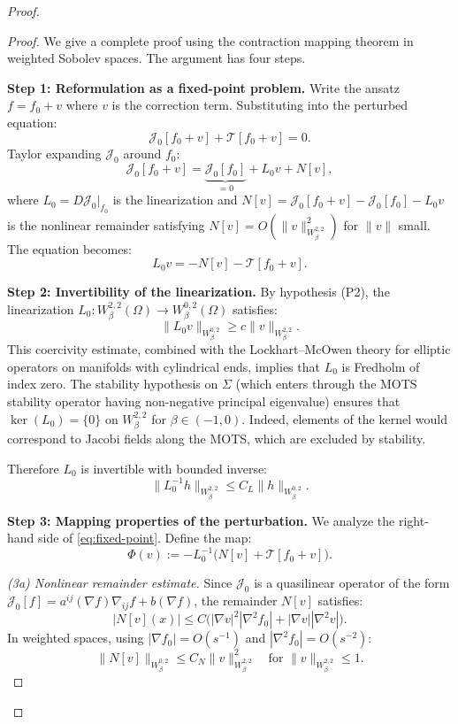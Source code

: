 \documentclass[12pt]{article}
\theoremstyle{plain}
\theoremstyle{definition}
\theoremstyle{remark}
\begin{document}
\begin{proof}
\begin{proof}
We give a complete proof using the contraction mapping theorem in weighted Sobolev spaces. The argument has four steps.

\textbf{Step 1: Reformulation as a fixed-point problem.}
Write the ansatz $f = f_0 + v$ where $v$ is the correction term. Substituting into the perturbed equation:
\[
\mathcal{J}_0[f_0 + v] + \mathcal{T}[f_0 + v] = 0.
\]
Taylor expanding $\mathcal{J}_0$ around $f_0$:
\[
\mathcal{J}_0[f_0 + v] = \underbrace{\mathcal{J}_0[f_0]}_{=0} + L_0 v + N[v],
\]
where $L_0 = D\mathcal{J}_0|_{f_0}$ is the linearization and $N[v] = \mathcal{J}_0[f_0 + v] - \mathcal{J}_0[f_0] - L_0 v$ is the nonlinear remainder satisfying $N[v] = O(\|v\|^2_{W^{2,2}_\beta})$ for $\|v\|$ small. The equation becomes:
\begin{equation}\label{eq:fixed-point}
L_0 v = -N[v] - \mathcal{T}[f_0 + v].
\end{equation}

\textbf{Step 2: Invertibility of the linearization.}
By hypothesis (P2), the linearization $L_0: W^{2,2}_\beta(\Omega) \to W^{0,2}_\beta(\Omega)$ satisfies:
\[
\|L_0 v\|_{W^{0,2}_\beta} \geq c \|v\|_{W^{2,2}_\beta}.
\]
This coercivity estimate, combined with the Lockhart--McOwen theory \cite{lockhartmccowen1985} for elliptic operators on manifolds with cylindrical ends, implies that $L_0$ is Fredholm of index zero. The stability hypothesis on $\Sigma$ (which enters through the MOTS stability operator having non-negative principal eigenvalue) ensures that $\ker(L_0) = \{0\}$ on $W^{2,2}_\beta$ for $\beta \in (-1, 0)$. Indeed, elements of the kernel would correspond to Jacobi fields along the MOTS, which are excluded by stability.

Therefore $L_0$ is invertible with bounded inverse:
\[
\|L_0^{-1} h\|_{W^{2,2}_\beta} \leq C_L \|h\|_{W^{0,2}_\beta}.
\]

\textbf{Step 3: Mapping properties of the perturbation.}
We analyze the right-hand side of \eqref{eq:fixed-point}. Define the map:
\[
\Phi(v) := -L_0^{-1}\bigl(N[v] + \mathcal{T}[f_0 + v]\bigr).
\]

\textit{(3a) Nonlinear remainder estimate.} Since $\mathcal{J}_0$ is a quasilinear operator of the form $\mathcal{J}_0[f] = a^{ij}(\nabla f)\nabla_{ij}f + b(\nabla f)$, the remainder $N[v]$ satisfies:
\[
|N[v](x)| \leq C\bigl(|\nabla v|^2 |\nabla^2 f_0| + |\nabla v||\nabla^2 v|\bigr).
\]
In weighted spaces, using $|\nabla f_0| = O(s^{-1})$ and $|\nabla^2 f_0| = O(s^{-2})$:
\[
\|N[v]\|_{W^{0,2}_\beta} \leq C_N \|v\|_{W^{2,2}_\beta}^2 \quad \text{for } \|v\|_{W^{2,2}_\beta} \leq 1.
\]


\end{proof}
\end{proof}
\end{document}
